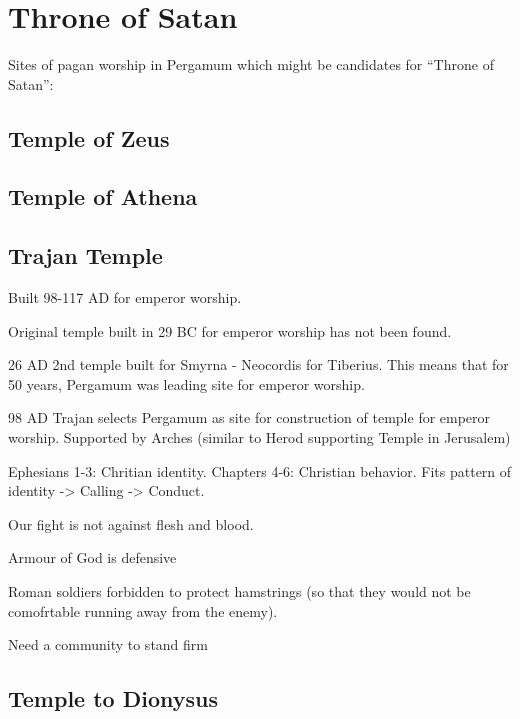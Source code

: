 \documentclass[
]{book}
\begin{document}
\hypertarget{throne-of-satan}{%
\section{Throne of Satan}\label{throne-of-satan}}

Sites of pagan worship in Pergamum which might be candidates for ``Throne of Satan'':

\hypertarget{temple-of-zeus}{%
\subsection{Temple of Zeus}\label{temple-of-zeus}}

\hypertarget{temple-of-athena}{%
\subsection{Temple of Athena}\label{temple-of-athena}}

\hypertarget{trajan-temple}{%
\subsection{Trajan Temple}\label{trajan-temple}}

Built 98-117 AD for emperor worship.

Original temple built in 29 BC for emperor worship has not been found.

26 AD 2nd temple built for Smyrna - Neocordis for Tiberius. This means that for 50 years, Pergamum was leading site for emperor worship.

98 AD Trajan selects Pergamum as site for construction of temple for emperor worship. Supported by Arches (similar to Herod supporting Temple in Jerusalem)

Ephesians 1-3: Chritian identity. Chapters 4-6: Christian behavior. Fits pattern of identity -\textgreater{} Calling -\textgreater{} Conduct.

Our fight is not against flesh and blood.

Armour of God is defensive

Roman soldiers forbidden to protect hamstrings (so that they would not be comofrtable running away from the enemy).

Need a community to stand firm

\hypertarget{temple-to-dionysus}{%
\subsection{Temple to Dionysus}\label{temple-to-dionysus}}
\end{document}
